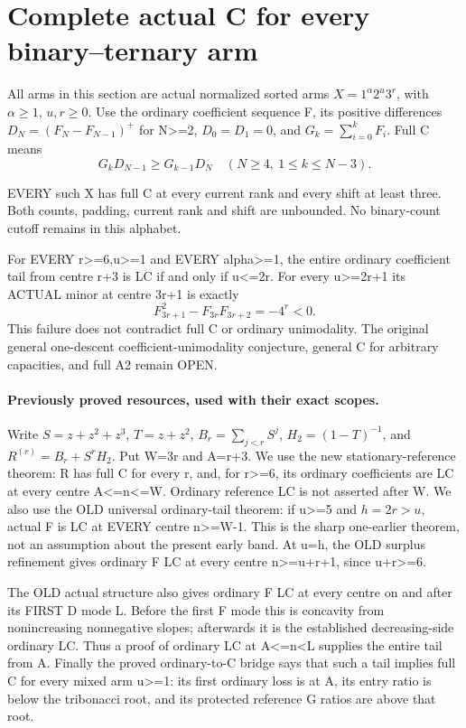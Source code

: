 \section{Complete actual C for every binary--ternary arm}
All arms in this section are actual normalized sorted arms
$X=1^\alpha2^u3^r$, with $\alpha\ge1$, $u,r\ge0$.
Use the ordinary coefficient sequence F, its positive differences
$D_N=(F_N-F_{N-1})^+$ for N>=2, $D_0=D_1=0$, and
$G_k=\sum_{i=0}^kF_i$. Full C means
\[
             G_kD_{N-1}\ge G_{k-1}D_N
                      \quad(N\ge4,\ 1\le k\le N-3).
\]

\begin{theorem}
EVERY such X has full C at every current rank and every shift at
least three. Both counts, padding, current rank and shift are
unbounded. No binary-count cutoff remains in this alphabet.
\end{theorem}

\begin{theorem}
For EVERY r>=6,u>=1 and EVERY alpha>=1, the entire ordinary
coefficient tail from centre r+3 is LC if and only if u<=2r.
For every u>=2r+1 its ACTUAL minor at centre 3r+1 is exactly
\[
                   F_{3r+1}^2-F_{3r}F_{3r+2}=-4^r<0.
                                                               \tag{1}
\]
This failure does not contradict full C or ordinary unimodality.
The original general one-descent coefficient-unimodality conjecture,
general C for arbitrary capacities, and full A2 remain OPEN.
\end{theorem}

\paragraph{Previously proved resources, used with their exact scopes.}
Write $S=z+z^2+z^3$, $T=z+z^2$, $B_r=\sum_{j<r}S^j$,
$H_2=(1-T)^{-1}$, and
$R^{(r)}=B_r+S^rH_2$. Put W=3r and A=r+3.
We use the new stationary-reference theorem: R has full C for
every r, and, for r>=6, its ordinary coefficients are LC at
every centre A<=n<=W. Ordinary reference LC is not asserted after W.
We also use the OLD universal ordinary-tail theorem: if u>=5 and
$h=2r>u$, actual F is LC at EVERY centre n>=W-1. This is the
sharp one-earlier theorem, not an assumption about the present
early band. At u=h, the OLD surplus refinement gives ordinary
F LC at every centre n>=u+r+1, since u+r>=6.

The OLD actual structure also gives ordinary F LC at every centre
on and after its FIRST D mode L. Before the first F mode this is
concavity from nonincreasing nonnegative slopes; afterwards it is
the established decreasing-side ordinary LC. Thus a proof of
ordinary LC at A<=n<L supplies the entire tail from A.
Finally the proved ordinary-to-C bridge says that such a tail
implies full C for every mixed arm u>=1: its first ordinary loss
is at A, its entry ratio is below the tribonacci root, and its
protected reference G ratios are above that root.

